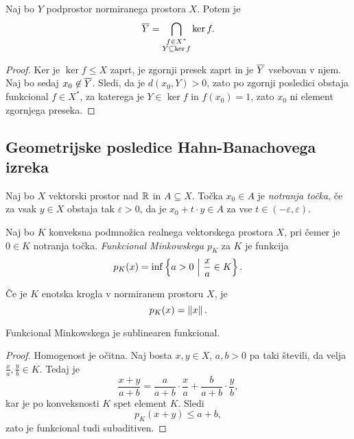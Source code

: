 \begin{izrek}
Naj bo $Y$ podprostor normiranega prostora $X$. Potem je
\[
\overline{Y} =
\bigcap_{\substack{f \in X^* \\ Y \subseteq \ker f}} \ker f.
\]
\end{izrek}

\begin{proof}
Ker je $\ker f \leq X$ zaprt, je zgornji presek zaprt in je
$\overline{Y}$ vsebovan v njem. Naj bo sedaj $x_0 \not \in \overline{Y}$.
Sledi, da je $d(x_0, Y) > 0$, zato po zgornji posledici obstaja
funkcional $f \in X^*$, za katerega je $Y \in \ker f$ in
$f(x_0) = 1$, zato $x_0$ ni element zgornjega preseka.
\end{proof}

\newpage

\subsection{Geometrijske posledice Hahn-Banachovega izreka}


\begin{definicija}
Naj bo $X$ vektorski prostor nad $\mathbb{R}$ in $A \subseteq X$. Točka
$x_0 \in A$ je \emph{notranja točka}, če za vsak
$y \in X$ obstaja tak $\varepsilon > 0$, da je
$x_0 + t \cdot y \in A$ za vse $t \in (-\varepsilon, \varepsilon)$.
\end{definicija}

\begin{definicija}
Naj bo $K$ konveksna podmnožica realnega vektorskega prostora $X$,
pri čemer je $0 \in K$ notranja točka.
\emph{Funkcional Minkowskega} $p_K$
za $K$ je funkcija
\[
p_K(x) = \inf \left\{a > 0~\middle\vert~\frac{x}{a} \in K\right\}.
\]
\end{definicija}

\begin{zgled}
Če je $K$ enotska krogla v normiranem prostoru $X$, je
\[
p_K(x) = \left\lVert x\right\rVert.
\]
\end{zgled}

\begin{trditev}
Funkcional Minkowskega je sublinearen funkcional.
\end{trditev}

\begin{proof}
Homogenost je očitna. Naj bosta $x, y \in X$, $a, b > 0$ pa taki
števili, da velja $\frac{x}{a}, \frac{y}{b} \in K$. Tedaj je
\[
\frac{x+y}{a+b} =
\frac{a}{a+b} \cdot \frac{x}{a} + \frac{b}{a+b} \cdot \frac{y}{b},
\]
kar je po konveksnosti $K$ spet element $K$. Sledi
\[
p_K(x+y) \leq a + b,
\]
zato je funkcional tudi subaditiven.
\end{proof}

